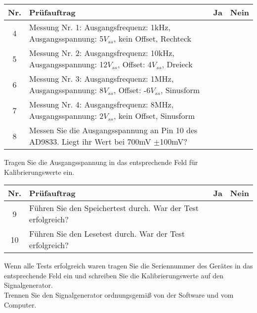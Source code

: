 \begin{flushleft}
	\begin{tabular}{|c||p{10cm}|c|c|}
		\hline
		Nr. & Prüfauftrag & Ja & Nein\\
		\hline
		4 & Messung Nr. 1: Ausgangsfrequenz: 1kHz, Ausgangsspannung: 5$V_{ss}$, kein Offset, Rechteck  & & \\
		\hline
		5 & Messung Nr. 2: Ausgangsfrequenz: 10kHz, Ausgangsspannung: 12$V_{ss}$, Offset: 4$V_{ss}$, Dreieck & & \\
		\hline
		6 & Messung Nr. 3: Ausgangsfrequenz: 1MHz, Ausgangsspannung: 8$V_{ss}$, Offset: -6$V_{ss}$, Sinusform & & \\
		\hline
		7 & Messung Nr. 4: Ausgangsfrequenz: 8MHz, Ausgangsspannung: 2$V_{ss}$, kein Offset, Sinusform & & \\
		\hline
		8 & Messen Sie die Ausgangsspannung an Pin 10 des AD9833. Liegt ihr Wert bei 700mV $\pm$100mV? & & \\
		\hline
	\end{tabular}
\end{flushleft}
Tragen Sie die Ausgangsspannung in das entsprechende Feld für Kalibrierungswerte ein.\\
\begin{flushleft}
	\begin{tabular}{|c||p{10cm}|c|c|}
		\hline
		Nr. & Prüfauftrag & Ja & Nein\\
		\hline
		9 & Führen Sie den Speichertest durch. War der Test erfolgreich? & & \\
		\hline
		10 & Führen Sie den Lesetest durch. War der Test erfolgreich? & & \\
		\hline
	\end{tabular}
\end{flushleft}
Wenn alle Tests erfolgreich waren tragen Sie die Seriennummer des Gerätes in das entsprechende Feld ein und schreiben Sie die Kalibrierungswerte auf den Signalgenerator.\\
Trennen Sie den Signalgenerator ordnungsgemäß von der Software und vom Computer.
